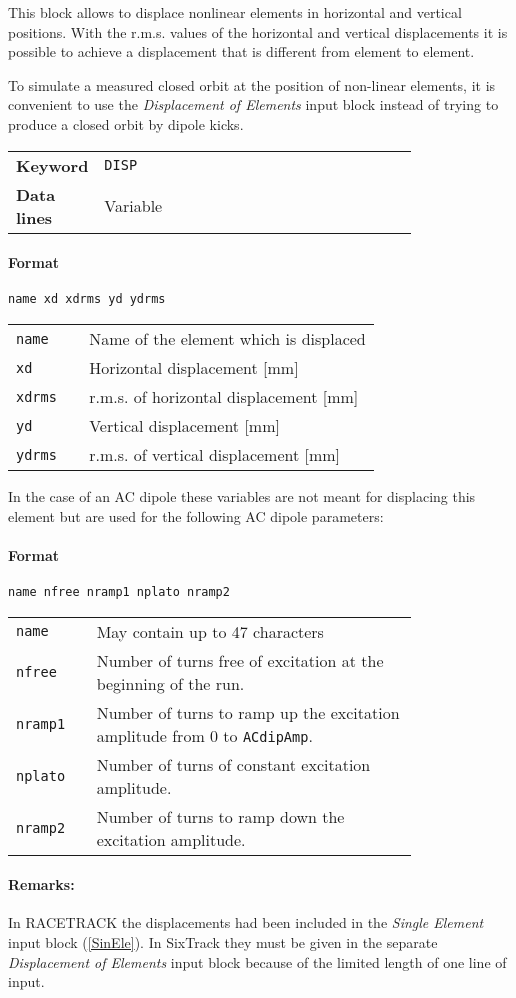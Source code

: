 This block allows to displace nonlinear elements in horizontal and vertical positions.
With the r.m.s. values of the horizontal and vertical displacements it is possible to achieve a displacement that is different from element to element.

To simulate a measured closed orbit at the position of non-linear elements, it is convenient to use the \textit{Displacement of Elements} input block instead of trying to produce a closed orbit by dipole kicks.

\bigskip
\begin{tabular}{@{}lp{0.80\linewidth}}
    \textbf{Keyword} & \texttt{DISP} \\
    \textbf{Data lines} & Variable
\end{tabular}

\paragraph{Format} \texttt{name xd xdrms yd ydrms}

\bigskip
\begin{tabular}{@{}lp{0.80\linewidth}}
    \texttt{name}  & Name of the element which is displaced \\
    \texttt{xd}    & Horizontal displacement [mm] \\
    \texttt{xdrms} & r.m.s. of horizontal displacement [mm] \\
    \texttt{yd}    & Vertical displacement [mm] \\
    \texttt{ydrms} & r.m.s. of vertical displacement [mm]
\end{tabular}

\bigskip
\noindent In the case of an AC dipole these variables are not meant for displacing this element but are used for the following AC dipole parameters:

\paragraph{Format} \texttt{name nfree nramp1 nplato nramp2}

\bigskip
\begin{tabular}{@{}lp{0.80\linewidth}}
    \texttt{name}   & May contain up to 47 characters \\
    \texttt{nfree}  & Number of turns free of excitation at the beginning of the run. \\
    \texttt{nramp1} & Number of turns to ramp up the excitation amplitude from 0 to \texttt{ACdipAmp}. \\
    \texttt{nplato} & Number of turns of constant excitation amplitude. \\
    \texttt{nramp2} & Number of turns to ramp down the excitation amplitude.
\end{tabular}

\paragraph{Remarks:}
In RACETRACK the displacements had been included in the \textit{Single Element} input block (\ref{SinEle}).
In SixTrack they must be given in the separate \textit{Displacement of Elements} input block because of the limited length of one line of input.

